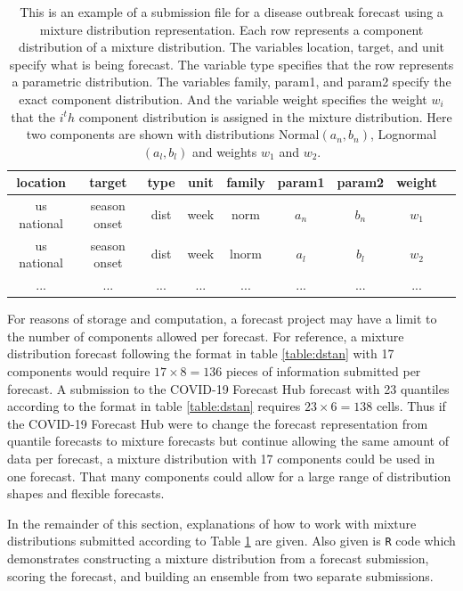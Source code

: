 \documentclass[11pt,notitlepage]{isuthesis}
\begin{document}
\begin{table}[h!]
\centering
 \begin{tabular}{|c|c|c|c|c|c|c|c|c|}
 \hline
    location & target & type & unit & family & param1 & param2 & weight
    \\ \hline
    us national & season onset & dist & week & norm & $a_n$ & $b_n$ & $w_1$\\
    us national & season onset & dist & week & lnorm & $a_l$ & $b_l$ & $w_2$\\
    ... & ... & ... & ... & ... & ... & ... & ...\\
 \hline
 \end{tabular}
 \begin{minipage}{11cm}
\captionsetup{font=scriptsize}
 \caption[Mixture distribution forecast submission example]{This is an example 
 of a 
 submission file
 for a disease outbreak forecast using a mixture distribution representation.
 Each row represents a component distribution
 of a mixture distribution. The variables
 location, target, and unit specify what is being forecast. The variable type
 specifies that the row represents a parametric distribution. The variables
 family, param1, and param2 specify the exact component distribution. 
 And the variable 
 weight specifies the weight $w_i$ that the $i^th$ component distribution is
 assigned in the
 mixture distribution. Here two components are shown with distributions
 Normal$(a_n, b_n)$, Lognormal$(a_l, b_l)$ and weights $w_1$ and $w_2$.}
 \label{table:mstan}
 \end{minipage}
\end{table}

For reasons of storage and computation, a forecast project may have a limit to 
the number of components allowed per forecast.
For reference, a mixture distribution forecast following the 
format in table \ref{table:dstan} with 17
components would require $17 \times 8 = 136$ pieces of information
submitted per forecast. 
A submission to the COVID-19 Forecast Hub forecast with 23 quantiles
according to the format in table \ref{table:dstan} requires
$23 \times 6 = 138$ cells. Thus if the COVID-19 Forecast Hub were to change the
forecast representation from quantile forecasts to mixture forecasts but 
continue allowing the same amount of data per forecast, 
a mixture distribution with 17 components could be used in one forecast. That
many components could allow for a large range of distribution shapes and 
flexible forecasts.

In the remainder of this section, explanations of how to work with 
mixture distributions submitted according to Table \ref{table:mstan} are 
given. Also given is
\texttt{R} code which 
demonstrates constructing a mixture distribution from a forecast submission, 
scoring the forecast, and building an ensemble from two separate submissions.
\end{document}
